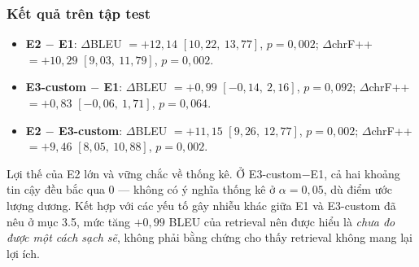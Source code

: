 \subsubsection*{Kết quả trên tập test}

\begin{itemize}
  \item \textbf{E2 $-$ E1}: $\Delta$BLEU $= +12,14$ $[10,22,\ 13,77]$, $p = 0,002$;
    $\Delta$chrF++ $= +10,29$ $[9,03,\ 11,79]$, $p = 0,002$.
  \item \textbf{E3-custom $-$ E1}: $\Delta$BLEU $= +0,99$ $[-0,14,\ 2,16]$, $p = 0,092$;
    $\Delta$chrF++ $= +0,83$ $[-0,06,\ 1,71]$, $p = 0,064$.
  \item \textbf{E2 $-$ E3-custom}: $\Delta$BLEU $= +11,15$ $[9,26,\ 12,77]$, $p = 0,002$;
    $\Delta$chrF++ $= +9,46$ $[8,05,\ 10,88]$, $p = 0,002$.
\end{itemize}

Lợi thế của E2 lớn và vững chắc về thống kê. Ở E3-custom$-$E1, cả hai khoảng tin cậy đều
bắc qua 0 — không có ý nghĩa thống kê ở $\alpha=0,05$, dù điểm ước lượng dương. Kết hợp
với các yếu tố gây nhiễu khác giữa E1 và E3-custom đã nêu ở mục 3.5, mức tăng $+0,99$
BLEU của retrieval nên được hiểu là \textit{chưa đo được một cách sạch sẽ}, không phải
bằng chứng cho thấy retrieval không mang lại lợi ích.



